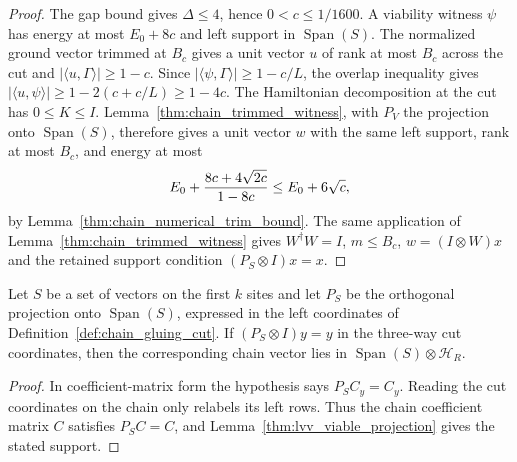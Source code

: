 \begin{proof}\leanok
    The gap bound gives $\Delta\le4$, hence $0<c\le1/1600$.
    A viability witness $\psi$ has energy at most $E_0+8c$ and left support
    in $\operatorname{Span}(S)$. The normalized ground vector trimmed at
    $B_c$ gives a unit vector $u$ of rank at most $B_c$ across the cut and
    $|\langle u,\Gamma\rangle|\ge1-c$. Since
    $|\langle\psi,\Gamma\rangle|\ge1-c/L$, the overlap inequality gives
    $|\langle u,\psi\rangle|\ge1-2(c+c/L)\ge1-4c$.
    The Hamiltonian decomposition at the cut has $0\le K\le I$.
    Lemma~\ref{thm:chain_trimmed_witness}, with $P_V$ the projection onto
    $\operatorname{Span}(S)$, therefore gives a unit vector $w$ with the
    same left support, rank at most $B_c$, and energy at most
    \begin{align}
        E_0+\frac{8c+4\sqrt{2c}}{1-8c}\le E_0+6\sqrt c, \notag
    \end{align}
    by Lemma~\ref{thm:chain_numerical_trim_bound}.
    The same application of Lemma~\ref{thm:chain_trimmed_witness} gives
    $W^\dagger W=I$, $m\le B_c$, $w=(I\otimes W)x$ and the retained support
    condition $(P_S\otimes I)x=x$.
\end{proof}

\begin{lemma}
    \label{thm:chain_gluing_support}
    \leanok
    Let $S$ be a set of vectors on the first $k$ sites and let $P_S$ be
    the orthogonal projection onto $\operatorname{Span}(S)$, expressed in
    the left coordinates of Definition~\ref{def:chain_gluing_cut}.
    If $(P_S\otimes I)y=y$ in the three-way cut coordinates, then the
    corresponding chain vector lies in
    $\operatorname{Span}(S)\otimes\mathcal H_R$.
\end{lemma}
\begin{proof}\leanok
    In coefficient-matrix form the hypothesis says $P_SC_y=C_y$.
    Reading the cut coordinates on the chain only relabels its left rows.
    Thus the chain coefficient matrix $C$ satisfies $P_SC=C$, and
    Lemma~\ref{thm:lvv_viable_projection} gives the stated support.
\end{proof}

